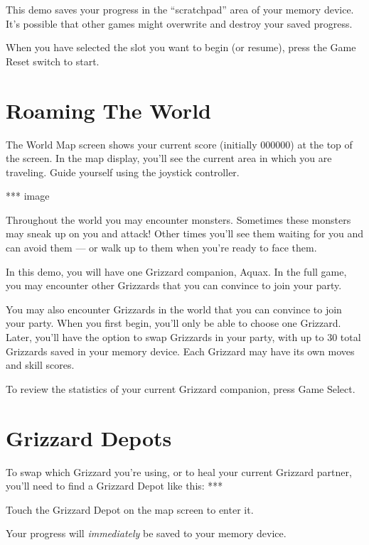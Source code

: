 \documentclass[12pt,openright,book]{memoir}
\begin{document}
\ifdefined\DEMO
This  demo  saves your  progress  in  the  ``scratchpad'' area  of  your
memory  device.  It's possible  that  other  games might  overwrite  and
destroy your saved progress.
\fi

When you have selected the slot you want to begin (or resume), press the
Game Reset switch to start.

\section{Roaming The World}

\ifdefined\TVNTSC
\else
The World Map screen shows your  current score (initially 000000) at the
top of the screen.
\fi
In the map display, you'll see the current area in which you
are traveling. Guide yourself using the joystick controller.

*** image

Throughout  the  world  you  may  encounter  monsters.  Sometimes  these
monsters may  sneak up on  you and attack!  Other times you'll  see them
waiting for you  and can avoid them  --- or walk up to  them when you're
ready to face them.

\ifdefined\DEMO
In this demo,  you will have one Grizzard companion,  Aquax. In the full
game, you  may encounter other Grizzards  that you can convince  to join
your party.

\else

You may also  encounter Grizzards in the world that  you can convince to
join your party. When you first begin, you'll only be able to choose one
Grizzard. Later, you'll have the option to swap Grizzards in your party,
with up to 30 total Grizzards saved in your memory device. Each Grizzard
may have its own moves and skill scores.

\fi

To  review the  statistics  of your  current  Grizzard companion,  press
Game Select.

\section{Grizzard Depots}

To \ifdefined\DEMO\else  swap which  Grizzard you're using,  or to  \fi heal
your current Grizzard partner, you'll need to find a Grizzard Depot like
this: ***

Touch the Grizzard Depot on the map screen to enter it.

Your progress will \emph{immediately} be saved to your memory device.
\end{document}
